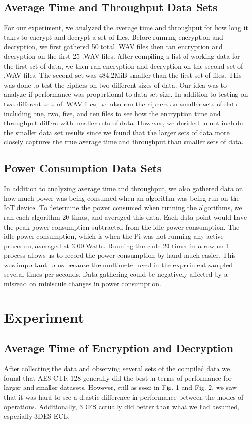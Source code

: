 \documentclass[conference]{IEEEtran}
\begin{document}
\subsection{Average Time and Throughput Data Sets}
For our experiment, we analyzed the average time and throughput for how long it takes to encrypt and decrypt a set of files. Before running encryption and decryption, we first gathered 50 total .WAV files then ran encryption and decryption on the first 25 .WAV files. After compiling a list of working data for the first set of data, we then ran encryption and decryption on the second set of .WAV files. The second set was 484.2MiB smaller than the first set of files. This was done to test the ciphers on two different sizes of data. Our idea was to analyze if performance was proportional to data set size.
In addition to testing on two different sets of .WAV files, we also ran the ciphers on smaller sets of data including one, two, five, and ten files to see how the encryption time and throughput differs with smaller sets of data. However, we decided to not include the smaller data set results since we found that the larger sets of data more closely captures the true average time and throughput than smaller sets of data.

\subsection{Power Consumption Data Sets}
In addition to analyzing average time and throughput, we also gathered data on how much power was being consumed when an algorithm was being run on the IoT device. To determine the power consumed when running the algorithms, we ran each algorithm 20 times, and averaged this data. Each data point would have the peak power consumption subtracted from the idle power consumption. The idle power consumption, which is when the Pi was not running any active processes, averaged at 3.00 Watts. Running the code 20 times in a row on 1 process allows us to record the power consumption by hand much easier. This was important to us because the multimeter used in the experiment sampled several times per seconds. Data gathering could be negatively affected by a misread on miniscule changes in power consumption.

\section{Experiment}
\subsection{Average Time of Encryption and Decryption}
After collecting the data and observing several sets of the compiled data we found that AES-CTR-128 generally did the best in terms of performance for larger and smaller datasets. However, still as seen in Fig. 1 and Fig. 2, we saw that it was hard to see a drastic difference in performance between the modes of operations. Additionally, 3DES actually did better than what we had assumed, especially 3DES-ECB.
\end{document}
